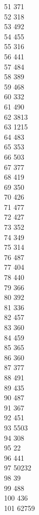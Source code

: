 { 51	371 \\
 52	318 \\
 53	492 \\
 54	455 \\
 55	316 \\
 56	441 \\
 57	484 \\
 58	389 \\
 59	468 \\
 60	332 \\
 61	490 \\
 62	3813 \\
 63	1215 \\
 64	483 \\
 65	353 \\
 66	503 \\
 67	377 \\
 68	419 \\
 69	350 \\
 70	426 \\
 71	477 \\
 72	427 \\
 73	352 \\
 74	349 \\
 75	314 \\
 76	487 \\
 77	404 \\
 78	440 \\
 79	366 \\
 80	392 \\
 81	336 \\
 82	457 \\
 83	360 \\
 84	459 \\
 85	365 \\
 86	360 \\
 87	377 \\
 88	491 \\
 89	435 \\
 90	487 \\
 91	367 \\
 92	451 \\
 93	5503 \\
 94	308 \\
 95	22 \\
 96	441 \\
 97	50232 \\
 98	39 \\
 99	488 \\
 100	436 \\
 101	62759 \\
}
